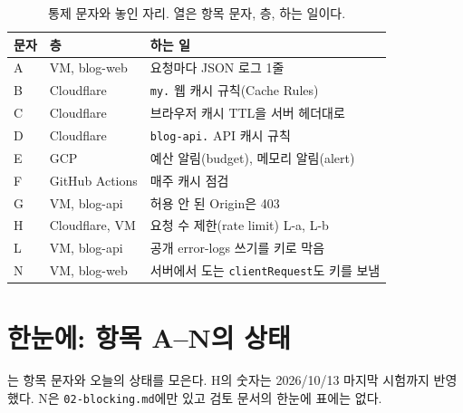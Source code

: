 \begin{table}[H]
  \caption{통제 문자와 놓인 자리. 열은 항목 문자, 층, 하는 일이다.}
  \label{tab:ctl-letters}
  \centering\small
  \begin{tabularx}{\linewidth}{@{}L{1.2cm}L{3.6cm}Y@{}}
    \toprule
    문자 & 층 & 하는 일 \\
    \midrule
    A & VM, blog-web & 요청마다 JSON 로그 1줄 \\
    \midrule
    B & Cloudflare & \texttt{my.} 웹 캐시 규칙(Cache Rules) \\
    \midrule
    C & Cloudflare & 브라우저 캐시 TTL을 서버 헤더대로 \\
    \midrule
    D & Cloudflare & \texttt{blog-api.} API 캐시 규칙 \\
    \midrule
    E & GCP & 예산 알림(budget), 메모리 알림(alert) \\
    \midrule
    F & GitHub Actions & 매주 캐시 점검 \\
    \midrule
    G & VM, blog-api & 허용 안 된 Origin은 403 \\
    \midrule
    H & Cloudflare, VM & 요청 수 제한(rate limit) L-a, L-b \\
    \midrule
    L & VM, blog-api & 공개 error-logs 쓰기를 키로 막음 \\
    \midrule
    N & VM, blog-web & 서버에서 도는 \texttt{clientRequest}도 키를 보냄 \\
    \bottomrule
  \end{tabularx}
\end{table}

\section{한눈에: 항목 A--N의 상태}\label{sec:ov-status}

는 항목 문자와 오늘의 상태를 모은다.
H의 숫자는 2026/10/13 마지막 시험까지 반영했다.
N은 \texttt{02-blocking.md}에만 있고 검토 문서의 한눈에 표에는 없다.

